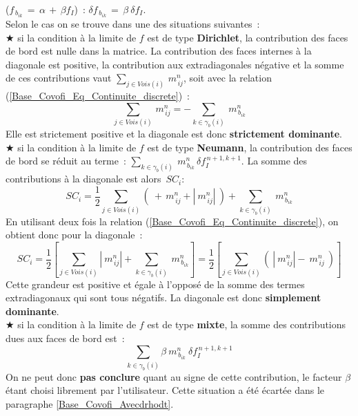 \begin{itemize}
($f_{\,b_{ik}}\,=\,\alpha\,+\,\beta f_I$)~: $\delta f_{\,b_{ik}}\,=\,\beta\
\delta f_I$.\\
Selon le cas on se trouve dans une des situations suivantes~:\\
\hspace*{1.cm} {\tiny$\bigstar$} si la condition à la limite de $f$ est de type
{\bf Dirichlet}, la contribution des faces de bord est nulle dans la matrice. La
contribution des faces internes à la diagonale est positive, la contribution
aux extradiagonales négative et la somme de ces contributions vaut
$\sum\limits_{j\in Vois(i)}\,m_{\,ij}^n$, soit avec la relation
(\ref{Base_Covofi_Eq_Continuite_discrete})~:
$$\sum\limits_{j\in Vois(i)}\,m_{\,ij}^n=-\sum\limits_{k\in {\gamma_b(i)}}\
m_{\,{b}_{ik}}^n  $$ Elle est strictement positive et la diagonale est donc
{\bf strictement dominante}.\\
\hspace*{1.cm} {\tiny$\bigstar$} si la condition à la limite de $f$ est de type
{\bf Neumann}, la contribution des faces de bord se réduit au terme~:
$
\sum\limits_{k\in {\gamma_b(i)}}\ m_{\,{b}_{ik}}^n \,\delta f_I^{\,n+1,k+1}
$.
La somme des contributions à la diagonale est alors~$SC_{i}$:
$$SC_{i}=\frac{1}{2}\sum\limits_{j\in Vois(i)}(\ +\,m_{\,ij}^n + |\ m_{\,ij}^n|\ )
+\sum\limits_{k\in {\gamma_b(i)}}\ m_{\,{b}_{ik}}^n $$
En utilisant deux fois la relation (\ref{Base_Covofi_Eq_Continuite_discrete}), on obtient donc pour la
diagonale~:
$$SC_{i}=\frac{1}{2}\left[\sum\limits_{j\in Vois(i)}|\ m_{\,ij}^n|
+\sum\limits_{k\in {\gamma_b(i)}}\
m_{\,{b}_{ik}}^n\right]=\frac{1}{2}\left[\sum\limits_{j\in Vois(i)}(\ |\ m_{\,ij}^n|-\ m_{\,ij}^n\ )\right]$$
Cette grandeur est positive et égale à l'opposé de la somme des termes
extradiagonaux qui sont tous négatifs. La diagonale est donc
{\bf simplement dominante}.\\
\hspace*{1.cm} {\tiny$\bigstar$} si la condition à la limite de $f$ est de type
{\bf mixte}, la somme des contributions dues aux faces de bord est~:\\
\begin{equation}
\sum\limits_{k \in \gamma_b(i)}\beta \ m_{\,{b}_{ik}}^n \ \delta f_I^{\,n+1,k+1}
\end{equation}
On ne peut donc {\bf pas conclure} quant au signe de cette contribution, le facteur
$\beta$ étant choisi librement par l'utilisateur. Cette situation a été
écartée dans le paragraphe \ref{Base_Covofi_Avecdrhodt}.\\

\end{itemize}

